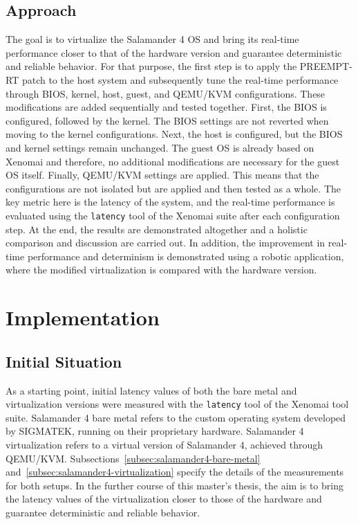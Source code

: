 \documentclass[MMR,Master,english]{style/twbook}
\begin{document}
\section{Approach}\label{sec:approach}
The goal is to virtualize the Salamander 4 OS and bring its real-time performance closer to that of the hardware version and guarantee deterministic and reliable behavior. For that purpose, the first step is to apply the PREEMPT-RT patch to the host system and subsequently tune the real-time performance through BIOS, kernel, host, guest, and QEMU/KVM configurations. These modifications are added sequentially and tested together. First, the BIOS is configured, followed by the kernel. The BIOS settings are not reverted when moving to the kernel configurations. Next, the host is configured, but the BIOS and kernel settings remain unchanged. The guest OS is already based on Xenomai and therefore, no additional modifications are necessary for the guest OS itself. Finally, QEMU/KVM settings are applied. This means that the configurations are not isolated but are applied and then tested as a whole. The key metric here is the latency of the system, and the real-time performance is evaluated using the \texttt{latency} tool of the Xenomai suite after each configuration step. At the end, the results are demonstrated altogether and a holistic comparison and discussion are carried out. In addition, the improvement in real-time performance and determinism is demonstrated using a robotic application, where the modified virtualization is compared with the hardware version.

\clearpage

\chapter{Implementation}

\section{Initial Situation}\label{sec:starting_situation}
As a starting point, initial latency values of both the bare metal and virtualization versions were measured with the \texttt{latency} tool of the Xenomai tool suite. Salamander 4 bare metal refers to the custom operating system developed by SIGMATEK, running on their proprietary hardware. Salamander 4 virtualization refers to a virtual version of Salamander 4, achieved through QEMU/KVM. Subsections~\ref{subsec:salamander4-bare-metal} and~\ref{subsec:salamander4-virtualization} specify the details of the measurements for both setups. In the further course of this master's thesis, the aim is to bring the latency values of the virtualization closer to those of the hardware and guarantee deterministic and reliable behavior.
\end{document}
